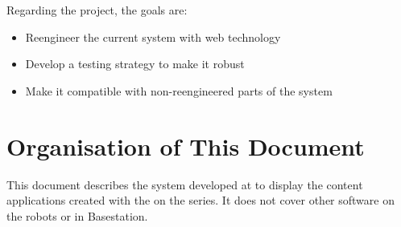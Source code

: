 Regarding the project, the goals are:
\begin{itemize}
	\item Reengineer the current system with web technology
	\item Develop a testing strategy to make it robust
	\item Make it compatible with non-reengineered parts of the system
\end{itemize}


\section{Organisation of This Document}
This document describes the system developed at \company to display the  content applications created with the \se on the  series.
It does not cover other software on the robots or in Basestation.

